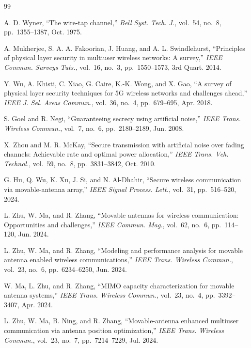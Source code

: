 \documentclass[journal]{IEEEtran}
\begin{document}
\begin{thebibliography}{99}

A. D. Wyner, ``The wire-tap channel,'' \emph{Bell Syst. Tech. J.}, vol.~54, no.~8, pp.~1355--1387, Oct. 1975.

A. Mukherjee, S. A. A. Fakoorian, J. Huang, and A. L. Swindlehurst, ``Principles of physical layer security in multiuser wireless networks: A survey,'' \emph{IEEE Commun. Surveys Tuts.}, vol.~16, no.~3, pp.~1550--1573, 3rd Quart. 2014.

Y. Wu, A. Khisti, C. Xiao, G. Caire, K.-K. Wong, and X. Gao, ``A survey of physical layer security techniques for 5G wireless networks and challenges ahead,'' \emph{IEEE J. Sel. Areas Commun.}, vol.~36, no.~4, pp.~679--695, Apr. 2018.

S. Goel and R. Negi, ``Guaranteeing secrecy using artificial noise,'' \emph{IEEE Trans. Wireless Commun.}, vol.~7, no.~6, pp.~2180--2189, Jun. 2008.

X. Zhou and M. R. McKay, ``Secure transmission with artificial noise over fading channels: Achievable rate and optimal power allocation,'' \emph{IEEE Trans. Veh. Technol.}, vol.~59, no.~8, pp.~3831--3842, Oct. 2010.

G. Hu, Q. Wu, K. Xu, J. Si, and N. Al-Dhahir, ``Secure wireless communication via movable-antenna array,'' \emph{IEEE Signal Process. Lett.}, vol.~31, pp.~516--520, 2024.

L. Zhu, W. Ma, and R. Zhang, ``Movable antennas for wireless communication: Opportunities and challenges,'' \emph{IEEE Commun. Mag.}, vol.~62, no.~6, pp.~114--120, Jun. 2024.

L. Zhu, W. Ma, and R. Zhang, ``Modeling and performance analysis for movable antenna enabled wireless communications,'' \emph{IEEE Trans. Wireless Commun.}, vol.~23, no.~6, pp.~6234--6250, Jun. 2024.

W. Ma, L. Zhu, and R. Zhang, ``MIMO capacity characterization for movable antenna systems,'' \emph{IEEE Trans. Wireless Commun.}, vol.~23, no.~4, pp.~3392--3407, Apr. 2024.

L. Zhu, W. Ma, B. Ning, and R. Zhang, ``Movable-antenna enhanced multiuser communication via antenna position optimization,'' \emph{IEEE Trans. Wireless Commun.}, vol.~23, no.~7, pp.~7214--7229, Jul. 2024.


\end{thebibliography}
\end{document}
